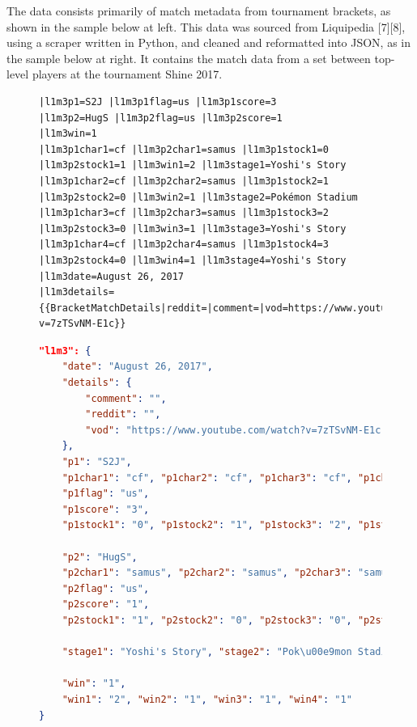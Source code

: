 \documentclass[10pt]{article}
\theoremstyle{definition}
\theoremstyle{remark}
\begin{document}
The data consists primarily of match metadata from tournament brackets,
as shown in the sample below at left. This data was sourced from Liquipedia [7][8],
using a scraper written in Python, and cleaned and reformatted into JSON, as
in the sample below at right. It contains the match data from a set between
top-level players at the tournament Shine 2017.

\begin{figure}[!ht]
    \begin{minipage}[t][][t]{.46\textwidth}
        \begin{lstlisting}
|l1m3p1=S2J |l1m3p1flag=us |l1m3p1score=3
|l1m3p2=HugS |l1m3p2flag=us |l1m3p2score=1
|l1m3win=1
|l1m3p1char1=cf |l1m3p2char1=samus |l1m3p1stock1=0 |l1m3p2stock1=1 |l1m3win1=2 |l1m3stage1=Yoshi's Story
|l1m3p1char2=cf |l1m3p2char2=samus |l1m3p1stock2=1 |l1m3p2stock2=0 |l1m3win2=1 |l1m3stage2=Pokémon Stadium
|l1m3p1char3=cf |l1m3p2char3=samus |l1m3p1stock3=2 |l1m3p2stock3=0 |l1m3win3=1 |l1m3stage3=Yoshi's Story
|l1m3p1char4=cf |l1m3p2char4=samus |l1m3p1stock4=3 |l1m3p2stock4=0 |l1m3win4=1 |l1m3stage4=Yoshi's Story
|l1m3date=August 26, 2017
|l1m3details={{BracketMatchDetails|reddit=|comment=|vod=https://www.youtube.com/watch?v=7zTSvNM-E1c}}
        \end{lstlisting}
    \end{minipage} \hfill
    \begin{minipage}[t][][t]{.5\textwidth}
        \begin{lstlisting}[language=json]
"l1m3": {
    "date": "August 26, 2017",
    "details": {
        "comment": "",
        "reddit": "",
        "vod": "https://www.youtube.com/watch?v=7zTSvNM-E1c"
    },
    "p1": "S2J",
    "p1char1": "cf", "p1char2": "cf", "p1char3": "cf", "p1char4": "cf",
    "p1flag": "us",
    "p1score": "3",
    "p1stock1": "0", "p1stock2": "1", "p1stock3": "2", "p1stock4": "3",

    "p2": "HugS",
    "p2char1": "samus", "p2char2": "samus", "p2char3": "samus", "p2char4": "samus",
    "p2flag": "us",
    "p2score": "1",
    "p2stock1": "1", "p2stock2": "0", "p2stock3": "0", "p2stock4": "0",

    "stage1": "Yoshi's Story", "stage2": "Pok\u00e9mon Stadium", "stage3": "Yoshi's Story", "stage4": "Yoshi's Story",

    "win": "1",
    "win1": "2", "win2": "1", "win3": "1", "win4": "1"
}
        \end{lstlisting}
    \end{minipage}
\end{figure}
\end{document}
